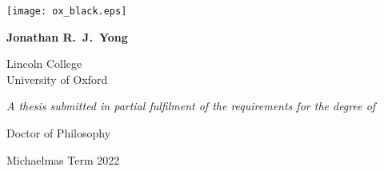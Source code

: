 \hspace{0pt}
\vfill
\begin{center}
    \Huge
    \textbf{\thesistitle}

    \vspace{1.0cm}

    \texttt{[image: ox\_black.eps]}

    \vspace{0.6cm}

    \LARGE
    \textbf{Jonathan R.\ J.\ Yong}

    \vspace{0.4cm}

    \Large
    Lincoln College \\ University of Oxford

    \vspace{1.0cm}

    \large
    \textit{A thesis submitted in partial fulfilment of the requirements for the degree of}

    \Large
    Doctor of Philosophy
    
    Michaelmas Term 2022
\end{center}
\thispagestyle{empty}
\vfill
\hspace{0pt}
\newpage
